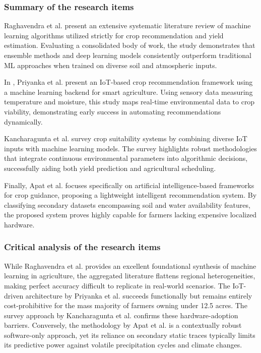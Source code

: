 \documentclass{FastFyp}
\begin{document}
\subsubsection{Summary of the research items}
Raghavendra et al. \cite{raghavendra2024systematic} present an extensive systematic literature review of machine learning algorithms utilized strictly for crop recommendation and yield estimation. Evaluating a consolidated body of work, the study demonstrates that ensemble methods and deep learning models consistently outperform traditional ML approaches when trained on diverse soil and atmospheric inputs.

In \cite{priyanka2023iot}, Priyanka et al. present an IoT-based crop recommendation framework using a machine learning backend for smart agriculture. Using sensory data measuring temperature and moisture, this study maps real-time environmental data to crop viability, demonstrating early success in automating recommendations dynamically.

Kancharagunta et al. \cite{kancharagunta2024crop} survey crop suitability systems by combining diverse IoT inputs with machine learning models. The survey highlights robust methodologies that integrate continuous environmental parameters into algorithmic decisions, successfully aiding both yield prediction and agricultural scheduling.

Finally, Apat et al. \cite{apat2023artificial} focuses specifically on artificial intelligence-based frameworks for crop guidance, proposing a lightweight intelligent recommendation system. By classifying secondary datasets encompassing soil and water availability features, the proposed system proves highly capable for farmers lacking expensive localized hardware.

\subsubsection{Critical analysis of the research items}
While Raghavendra et al. \cite{raghavendra2024systematic} provides an excellent foundational synthesis of machine learning in agriculture, the aggregated literature flattens regional heterogeneities, making perfect accuracy difficult to replicate in real-world scenarios. The IoT-driven architecture by Priyanka et al. \cite{priyanka2023iot} succeeds functionally but remains entirely cost-prohibitive for the mass majority of farmers owning under 12.5 acres. The survey approach by Kancharagunta et al. \cite{kancharagunta2024crop} confirms these hardware-adoption barriers. Conversely, the methodology by Apat et al. \cite{apat2023artificial} is a contextually robust software-only approach, yet its reliance on secondary static traces typically limits its predictive power against volatile precipitation cycles and climate changes.
\end{document}
